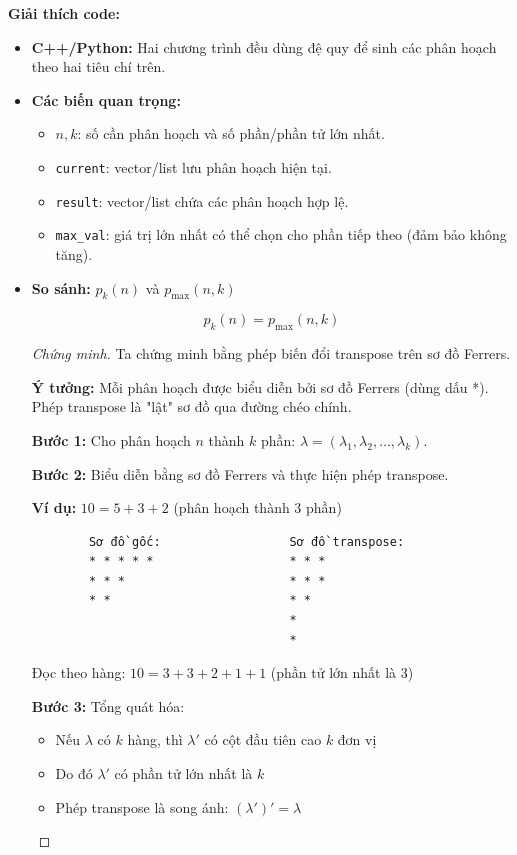 \documentclass{article}
\begin{document}
\textbf{Giải thích code:}

\begin{itemize}
    \item \textbf{C++/Python:} Hai chương trình đều dùng đệ quy để sinh các phân hoạch theo hai tiêu chí trên.
    \item \textbf{Các biến quan trọng:}
    \begin{itemize}
        \item $n, k$: số cần phân hoạch và số phần/phần tử lớn nhất.
        \item \texttt{current}: vector/list lưu phân hoạch hiện tại.
        \item \texttt{result}: vector/list chứa các phân hoạch hợp lệ.
        \item \texttt{max\_val}: giá trị lớn nhất có thể chọn cho phần tiếp theo (đảm bảo không tăng).
    \end{itemize}
    \item \textbf{So sánh:} $p_k(n)$ và $p_{\max}(n, k)$

    \[
    p_k(n) = p_{\max}(n, k)
    \]

    \begin{proof}[Chứng minh]
        Ta chứng minh bằng phép biến đổi transpose trên sơ đồ Ferrers.

        \textbf{Ý tưởng:} Mỗi phân hoạch được biểu diễn bởi sơ đồ Ferrers (dùng dấu *). Phép transpose là "lật" sơ đồ qua đường chéo chính.
        
        \textbf{Bước 1:} Cho phân hoạch $n$ thành $k$ phần: $\lambda = (\lambda_1, \lambda_2, \ldots, \lambda_k)$.
        
        \textbf{Bước 2:} Biểu diễn bằng sơ đồ Ferrers và thực hiện phép transpose.
        
        \textbf{Ví dụ:} $10 = 5 + 3 + 2$ (phân hoạch thành 3 phần)
        
        \begin{verbatim}
        Sơ đồ gốc:                  Sơ đồ transpose:
        * * * * *                   * * *
        * * *                       * * *
        * *                         * *
                                    *
                                    *
        \end{verbatim}
        
        Đọc theo hàng: $10 = 3 + 3 + 2 + 1 + 1$ (phần tử lớn nhất là 3)
        
        \textbf{Bước 3:} Tổng quát hóa:
        \begin{itemize}
            \item Nếu $\lambda$ có $k$ hàng, thì $\lambda'$ có cột đầu tiên cao $k$ đơn vị
            \item Do đó $\lambda'$ có phần tử lớn nhất là $k$
            \item Phép transpose là song ánh: $(\lambda')' = \lambda$
        \end{itemize}
    \end{proof}
\end{itemize}
\end{document}
